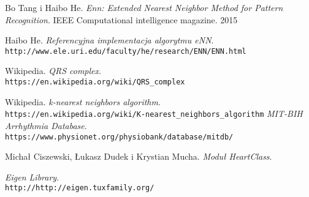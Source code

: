\begin{thebibliography}{9}
	Bo Tang i Haibo He. 
	\textit{Enn: Extended Nearest Neighbor Method for Pattern Recognition}. 
	IEEE Computational intelligence magazine. 2015
	
	Haibo He.
	\textit{Referencyjna implementacja algorytmu eNN}.
	\\\texttt{http://www.ele.uri.edu/faculty/he/research/ENN/ENN.html}
	
	Wikipedia.
	\textit{QRS complex}.	\\\texttt{https://en.wikipedia.org/wiki/QRS\_complex}
	
	Wikipedia.
	\textit{k-nearest neighbors algorithm}.	\\\texttt{https://en.wikipedia.org/wiki/K-nearest\_neighbors\_algorithm}
	\textit{MIT-BIH Arrhythmia Database}.	\\\texttt{https://www.physionet.org/physiobank/database/mitdb/}
	
	Michał Ciszewski, Łukasz Dudek i Krystian Mucha.
	\textit{Moduł HeartClass}.
	
	\textit{Eigen Library}.
	\\\texttt{http://http://eigen.tuxfamily.org/}
\end{thebibliography}

